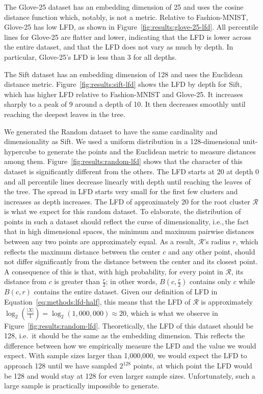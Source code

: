 The Glove-25 dataset has an embedding dimension of 25 and uses the cosine distance function which, notably, is not a metric.
Relative to Fashion-MNIST, Glove-25 has low LFD, as shown in Figure~\ref{fig:results:glove-25-lfd}.
All percentile lines for Glove-25 are flatter and lower, indicating that the LFD is lower across the entire dataset, and that the LFD does not vary as much by depth.
In particular, Glove-25's LFD is less than 3 for all depths.

The Sift dataset has an embedding dimension of 128 and uses the Euclidean distance metric.
Figure~\ref{fig:results:sift-lfd} shows the LFD by depth for Sift, which has higher LFD relative to Fashion-MNIST and Glove-25.
It increases sharply to a peak of 9 around a depth of 10.
It then decreases smoothly until reaching the deepest leaves in the tree.

We generated the Random dataset to have the same cardinality and dimensionality as Sift.
We used a uniform distribution in a 128-dimensional unit-hypercube to generate the points and the Euclidean metric to measure distances among them.
Figure~\ref{fig:results:random-lfd} shows that the character of this dataset is significantly different from the others.
The LFD starts at 20 at depth 0 and all percentile lines decrease linearly with depth until reaching the leaves of the tree.
The spread in LFD starts very small for the first few clusters and increases as depth increases.
The LFD of approximately 20 for the root cluster $\mathcal{R}$ is what we expect for this random dataset.
To elaborate, the distribution of points in such a dataset should reflect the curse of dimensionality, i.e.,\,the fact that in high dimensional spaces, the minimum and maximum pairwise distances between any two points are approximately equal.
As a result, $\mathcal{R}$'s radius $r$, which reflects the maximum distance between the center $c$ and any other point, should not differ significantly from the distance between the center and its closest point.
A consequence of this is that, with high probability, for every point in $\mathcal{R}$, its distance from $c$ is greater than $\tfrac{r}{2}$;
in other words, $B(c, \tfrac{r}{2})$ contains only $c$ while $B(c, r)$ contains the entire dataset.
Given our definition of LFD in Equation~\ref{eq:methods:lfd-half}, this means that the LFD of $\mathcal{R}$ is approximately $\log_2(\frac{|X|}{1}) = \log_2(1,000,000) \approx 20$, which is what we observe in Figure~\ref{fig:results:random-lfd}.
Theoretically, the LFD of this dataset should be 128, i.e.\, it should be the same as the embedding dimension.
This reflects the difference between how we empirically measure the LFD and the value we would expect.
With sample sizes larger than 1,000,000, we would expect the LFD to approach 128 until we have sampled $2^{128}$ points, at which point the LFD would be 128 and would stay at 128 for even larger sample sizes.
Unfortunately, such a large sample is practically impossible to generate.

